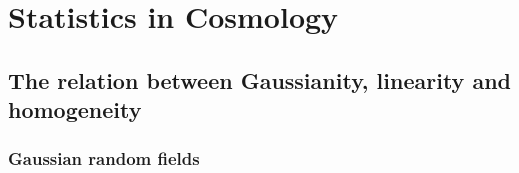 \chapter{Statistics in Cosmology} %

\label{Statis} %


\section{The relation between Gaussianity, linearity and homogeneity}

\subsection{Gaussian random fields}

